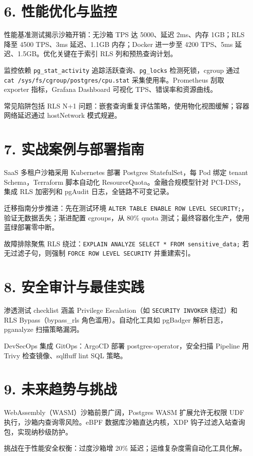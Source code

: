 \chapter{6. 性能优化与监控}
性能基准测试揭示沙箱开销：无沙箱 TPS 达 5000、延迟 2ms、内存 1GB；RLS 降至 4500 TPS、3ms 延迟、1.1GB 内存；Docker 进一步至 4200 TPS、5ms 延迟、1.5GB。优化关键在于索引 RLS 列和预热查询计划。\par
监控依赖 \texttt{pg\_{}stat\_{}activity} 追踪活跃查询、\texttt{pg\_{}locks} 检测死锁，cgroup 通过 \texttt{cat /sys/fs/cgroup/postgres/cpu.stat} 采集使用率。Prometheus 刮取 exporter 指标，Grafana Dashboard 可视化 TPS、错误率和资源曲线。\par
常见陷阱包括 RLS N+1 问题：嵌套查询重复评估策略，使用物化视图缓解；容器网络延迟通过 hostNetwork 模式规避。\par
\chapter{7. 实战案例与部署指南}
SaaS 多租户沙箱采用 Kubernetes 部署 Postgres StatefulSet，每 Pod 绑定 tenant Schema，Terraform 脚本自动化 ResourceQuota。金融合规模型针对 PCI-DSS，集成 RLS 加密列和 pgAudit 日志，全链路不可变记录。\par
迁移指南分步推进：先在测试环境 \texttt{ALTER TABLE ENABLE ROW LEVEL SECURITY;}，验证无数据丢失；渐进配置 cgroups，从 80\%{} quota 测试；最终容器化生产，使用蓝绿部署零中断。\par
故障排除聚焦 RLS 绕过：\texttt{EXPLAIN ANALYZE SELECT * FROM sensitive\_{}data;} 若无过滤子句，则强制 \texttt{FORCE ROW LEVEL SECURITY} 并重建索引。\par
\chapter{8. 安全审计与最佳实践}
渗透测试 checklist 涵盖 Privilege Escalation（如 \texttt{SECURITY INVOKER} 绕过）和 RLS Bypass（bypass\_{}rls 角色滥用）。自动化工具如 pgBadger 解析日志，pganalyze 扫描策略漏洞。\par
DevSecOps 集成 GitOps：ArgoCD 部署 postgres-operator，安全扫描 Pipeline 用 Trivy 检查镜像、sqlfluff lint SQL 策略。\par
\chapter{9. 未来趋势与挑战}
WebAssembly（WASM）沙箱前景广阔，Postgres WASM 扩展允许无权限 UDF 执行，沙箱内查询零风险。eBPF 数据库沙箱直达内核，XDP 钩子过滤入站查询包，实现纳秒级防护。\par
挑战在于性能安全权衡：过度沙箱增 20\%{} 延迟；运维复杂度需自动化工具化解。\par
